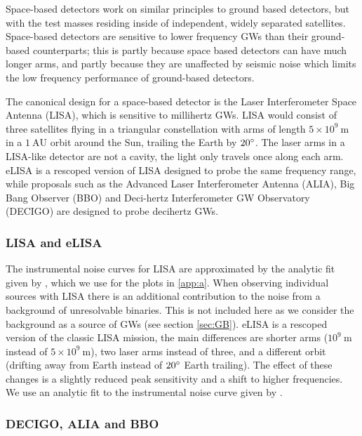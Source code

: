 Space-based detectors work on similar principles to ground based detectors, but with the test masses residing inside of independent, widely separated satellites. Space-based detectors are sensitive to lower frequency GWs than their ground-based counterparts; this is partly because space based detectors can have much longer arms, and partly because they are unaffected by seismic noise which limits the low frequency performance of ground-based detectors. 

The canonical design for a space-based detector is the Laser Interferometer Space Antenna (LISA), which is sensitive to millihertz GWs. LISA would consist of three satellites flying in a triangular constellation with arms of length $5\times 10^{9}~\mathrm{m}$ in a $1~\mathrm{AU}$ orbit around the Sun, trailing the Earth by $20^\circ$. The laser arms in a LISA-like detector are not a cavity, the light only travels once along each arm. eLISA is a rescoped version of LISA designed to probe the same frequency range, while proposals such as the Advanced Laser Interferometer Antenna (ALIA), Big Bang Observer (BBO) and Deci-hertz Interferometer GW Observatory (DECIGO) are designed to probe decihertz GWs.

\subsubsection{LISA and eLISA}

The instrumental noise curves for LISA are approximated by the analytic fit given by \citet{Sathyaprakash}, which we use for the plots in \ref{app:a}. When observing individual sources with LISA there is an additional contribution to the noise from a background of unresolvable binaries. This is not included here as we consider the background as a source of GWs (see section \ref{sec:GB}). eLISA is a rescoped version of the classic LISA mission, the main differences are shorter arms ($10^{9}~\mathrm{m}$ instead of $5\times 10^{9}~\mathrm{m}$), two laser arms instead of three, and a different orbit (drifting away from Earth instead of $20^\circ$ Earth trailing). The effect of these changes is a slightly reduced peak sensitivity and a shift to higher frequencies. We use an analytic fit to the instrumental noise curve given by \citet{Amaro-Seoane-et-al}.

\subsubsection{DECIGO, ALIA and BBO}

